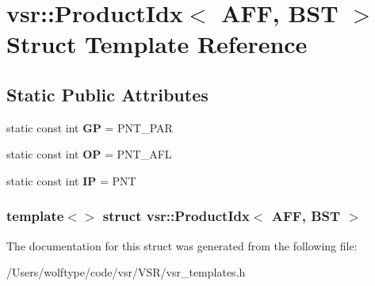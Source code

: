 \hypertarget{structvsr_1_1_product_idx_3_01_a_f_f_00_01_b_s_t_01_4}{\section{vsr\-:\-:Product\-Idx$<$ A\-F\-F, B\-S\-T $>$ Struct Template Reference}
\label{structvsr_1_1_product_idx_3_01_a_f_f_00_01_b_s_t_01_4}
}
\subsection*{Static Public Attributes}
\begin{DoxyCompactItemize}
\item 
\hypertarget{structvsr_1_1_product_idx_3_01_a_f_f_00_01_b_s_t_01_4_a1f663cdfad08e3a15de02df8b0786623}{static const int {\bfseries G\-P} = P\-N\-T\-\_\-\-P\-A\-R}\label{structvsr_1_1_product_idx_3_01_a_f_f_00_01_b_s_t_01_4_a1f663cdfad08e3a15de02df8b0786623}

\item 
\hypertarget{structvsr_1_1_product_idx_3_01_a_f_f_00_01_b_s_t_01_4_a66674db6c2c1fc03484582f1251ae01d}{static const int {\bfseries O\-P} = P\-N\-T\-\_\-\-A\-F\-L}\label{structvsr_1_1_product_idx_3_01_a_f_f_00_01_b_s_t_01_4_a66674db6c2c1fc03484582f1251ae01d}

\item 
\hypertarget{structvsr_1_1_product_idx_3_01_a_f_f_00_01_b_s_t_01_4_ad06613c603172ab248558bf3e722e7b6}{static const int {\bfseries I\-P} = P\-N\-T}\label{structvsr_1_1_product_idx_3_01_a_f_f_00_01_b_s_t_01_4_ad06613c603172ab248558bf3e722e7b6}

\end{DoxyCompactItemize}
\subsubsection*{template$<$$>$ struct vsr\-::\-Product\-Idx$<$ A\-F\-F, B\-S\-T $>$}



The documentation for this struct was generated from the following file\-:\begin{DoxyCompactItemize}
\item 
/\-Users/wolftype/code/vsr/\-V\-S\-R/vsr\-\_\-templates.\-h\end{DoxyCompactItemize}
